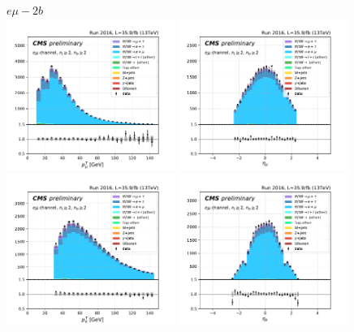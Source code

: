 \begin{figure}[ht]
    \centering
    $e\mu - 2b$ \\
    \includegraphics[width=0.49\textwidth]{chapters/Analysis/sectionPlots/figures/kinematics_pickles/emu2/2b/emu2_2b_lepton1_pt.pdf}
    \includegraphics[width=0.49\textwidth]{chapters/Analysis/sectionPlots/figures/kinematics_pickles/emu2/2b/emu2_2b_lepton1_eta.pdf}
    \includegraphics[width=0.49\textwidth]{chapters/Analysis/sectionPlots/figures/kinematics_pickles/emu2/2b/emu2_2b_lepton2_pt.pdf}
    \includegraphics[width=0.49\textwidth]{chapters/Analysis/sectionPlots/figures/kinematics_pickles/emu2/2b/emu2_2b_lepton2_eta.pdf}

\end{figure}
